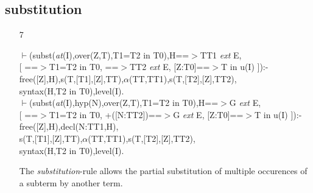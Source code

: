 \documentclass[11pt]{report}
\begin{document}
 \subsection{substitution}
 \begin{enumerate}
 \item[7]
\begin{sf}\begin{tabbing}
$\vdash$(subst(\mbox{\it at}(I),over(Z,T),T1=T2 in T0),H==$>$TT1 \mbox{\it ext} E, \\[-0.15ex]
\hspace{2em}[ ==$>$T1=T2 in T0, ==$>$TT2 \mbox{\it ext} E, [Z:T0]==$>$T in u(I) ]):-\\[-0.15ex]
\hspace{2em}free([Z],H),s(T,[T1],[Z],TT),$\alpha$(TT,TT1),s(T,[T2],[Z],TT2),\\[-0.15ex]
\hspace{2em}syntax(H,T2 in T0),level(I).\\[-0.15ex]
$\vdash$(subst(\mbox{\it at}(I),hyp(N),over(Z,T),T1=T2 in T0),H==$>$G \mbox{\it ext} E,\\[-0.15ex]
\hspace{2em}[ ==$>$T1=T2 in T0, +([N:TT2])==$>$G \mbox{\it ext} E, [Z:T0]==$>$T in u(I) ]):-\\[-0.15ex]
\hspace{2em}free([Z],H),decl(N:TT1,H),\\[-0.15ex]
\hspace{2em}s(T,[T1],[Z],TT),$\alpha$(TT,TT1),s(T,[T2],[Z],TT2),\\[-0.15ex]
\hspace{2em}syntax(H,T2 in T0),level(I).
\end{tabbing}\end{sf}

 The \emph{substitution}-rule allows the partial substitution
 of multiple occurences of a subterm by another term.
 \end{enumerate}
  
\end{document}
